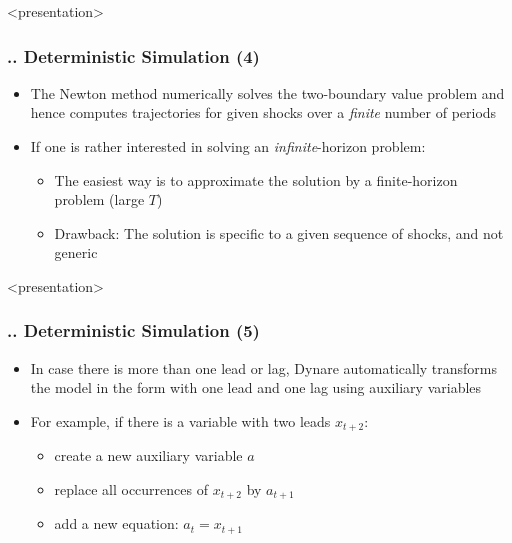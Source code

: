 \documentclass[11pt,aspectratio=169]{beamer}
\begin{document}
\begin{frame}<presentation>
	\frametitle{{\thesection.\thesubsection.\thesubsubsection} Deterministic Simulation (4)}
	\begin{itemize}
		\item The Newton method numerically solves the two-boundary value problem and hence computes trajectories for given shocks over a \textit{finite} number of periods
		\item If one is rather interested in solving an \textit{infinite}-horizon problem:
		\begin{itemize}
			\item The easiest way is to approximate the solution by a finite-horizon problem \linebreak (large $T$)
			\item Drawback: The solution is specific to a given sequence of shocks, and not generic
		\end{itemize} 
	\end{itemize}
\end{frame}
\begin{frame}<presentation>
	\frametitle{{\thesection.\thesubsection.\thesubsubsection} Deterministic Simulation (5)}
	\begin{itemize}  
		\item In case there is more than one lead or lag, Dynare automatically transforms the model in the form with one lead and one lag using auxiliary variables 
		\item For example, if there is a variable with two leads $x_{t+2}$:
		\begin{itemize}
			\item create a new auxiliary variable $a$
			\item replace all occurrences of $x_{t+2}$ by $a_{t+1}$
			\item add a new equation: $a_t = x_{t+1}$		
		\end{itemize}
	\end{itemize}
\end{frame}
\end{document}
